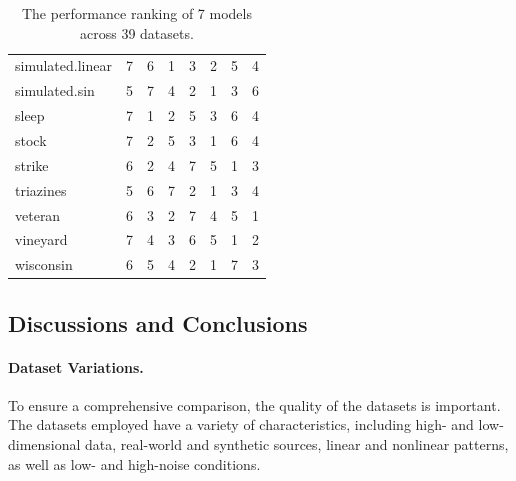 \documentclass[12pt]{article}
\begin{document}
\begin{table}[!ht]
\begin{tabular}{lrrrrrrr}
simulated.linear & 7 & 6 & 1 & 3 & 2 & 5 & 4 \\
simulated.sin & 5 & 7 & 4 & 2 & 1 & 3 & 6 \\
sleep & 7 & 1 & 2 & 5 & 3 & 6 & 4 \\
stock & 7 & 2 & 5 & 3 & 1 & 6 & 4 \\
strike & 6 & 2 & 4 & 7 & 5 & 1 & 3 \\
triazines & 5 & 6 & 7 & 2 & 1 & 3 & 4 \\
veteran & 6 & 3 & 2 & 7 & 4 & 5 & 1 \\
vineyard & 7 & 4 & 3 & 6 & 5 & 1 & 2 \\
wisconsin & 6 & 5 & 4 & 2 & 1 & 7 & 3 \\
\bottomrule
\end{tabular}
\caption{The performance ranking of 7 models across 39 datasets.}
\end{table}

\subsection{Discussions and Conclusions} \label{sec:discussion}
\paragraph{Dataset Variations.}
To ensure a comprehensive comparison, the quality of the datasets is important.
The datasets employed have a variety of characteristics, including high- and low-dimensional data, real-world and synthetic sources, linear and nonlinear patterns, as well as low- and high-noise conditions. 
\end{document}
